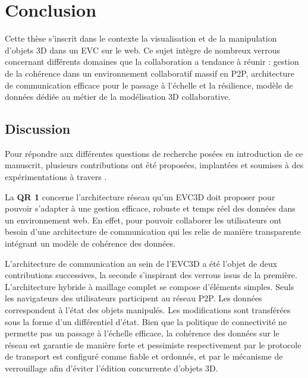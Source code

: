 \chapter{Conclusion}
\chaptertable

Cette thèse s'inscrit dans le contexte la visualisation et de la manipulation d'objets 
3D dans un \gls{EVC} sur le web. Ce sujet intègre de nombreux verrous 
concernant différents domaines que la collaboration a tendance à réunir : gestion 
de la cohérence dans un environnement collaboratif massif en \gls{P2P}, 
architecture de communication efficace pour le passage à l'échelle et la résilience, 
modèle de données dédiée au métier de la modélisation 3D collaborative. 

\section{Discussion}
Pour répondre aux différentes questions de 
recherche posées en introduction de ce manuscrit, plusieurs contributions ont été 
proposées, implantées et soumises à des expérimentations à travers 
\cite{Desprat2015a,Desprat2015b,Desprat2016,Desprat2017}. 


La \textbf{QR 1} concerne l'architecture réseau qu'un \gls{EVC3D} doit proposer 
pour 
pouvoir s'adapter à une gestion efficace, robuste et temps réel des données dans 
un environnement web. En effet, pour pouvoir collaborer les utilisateurs ont besoin 
d'une architecture de communication qui les relie de manière transparente 
intégrant un modèle de cohérence des données. 

L'architecture de communication au sein de l'\gls{EVC3D} a été l'objet de deux 
contributions successives, la seconde s'inspirant des verrous issus de la 
première. 
L'architecture hybride à maillage complet se compose d'éléments 
simples. 
Seuls 
les navigateurs des utilisateurs participent au réseau \gls{P2P}. Les données 
correspondent à l'état des objets manipulés. Les modifications sont transférées 
sous la forme d'un différentiel d'état. Bien que la politique de connectivité ne 
permette pas un passage à l'échelle efficace, la cohérence des données sur le 
réseau est garantie de manière forte et pessimiste respectivement par le protocole 
de transport est configuré comme fiable et ordonnés, et par le mécanisme de 
verrouillage afin d'éviter l'édition concurrente d'objets 3D.


